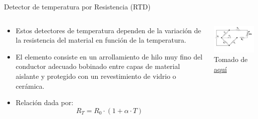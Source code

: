 \documentclass[aspectratio=169]{beamer}
\begin{document}
\begin{frame}{Detector de temperatura por Resistencia (RTD)}
    \begin{columns}[c, onlytextwidth]
        \begin{column}{0.55\textwidth}
            \begin{itemize}
                \item Estos detectores de temperatura dependen de la variación de la resistencia del material en función de la temperatura.  
                \item El elemento consiste en un arrollamiento de hilo muy fino del conductor adecuado bobinado entre capas de material aislante y protegido con un revestimiento de vidrio o cerámica. 
                \item Relación dada por: 
                \begin{equation*}
                    R_T=R_0\cdot (1+\alpha \cdot T)
                \end{equation*}
            \end{itemize}
        \end{column}
        \begin{column}{0.45\textwidth}
            \includegraphics[width=6cm]{fig/RTD_Circuit.jpg}
            \\ \tiny{Tomado de \href{https://www.azom.com/article.aspx?ArticleID=5573}{aquí}}
        \end{column}
    \end{columns}
\end{frame}
\end{document}
